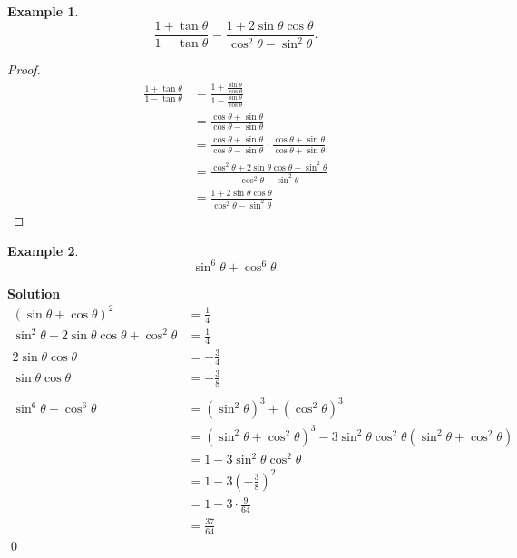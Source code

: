 \documentclass{article}
\newtheorem*{example*}{Example}
\newenvironment{solution}{\begin{trivlist}\item[]{\bf Solution}}{\qed \end{trivlist}}
\begin{document}
\newpage
\begin{example*}
    \[
    \frac{1 + \tan\theta}{1 - \tan\theta} = \frac{1 + 2\sin\theta\cos\theta}{\cos^2\theta - \sin^2\theta}.
    \]
\end{example*}
\begin{proof}
    \begin{align*}
        \frac{1 + \tan\theta}{1 - \tan\theta}
        &= \frac{1 + \frac{\sin\theta}{\cos\theta}}{1 - \frac{\sin\theta}{\cos\theta}} \\
        &= \frac{\cos\theta + \sin\theta}{\cos\theta - \sin\theta} \\
        &= \frac{\cos\theta + \sin\theta}{\cos\theta - \sin\theta} \cdot \frac{\cos\theta + \sin\theta}{\cos\theta + \sin\theta} \\
        &= \frac{\cos^2\theta + 2\sin\theta\cos\theta + \sin^2\theta}{\cos^2\theta - \sin^2\theta} \\
        &= \boxed{\frac{1 + 2\sin\theta\cos\theta}{\cos^2\theta - \sin^2\theta}}
    \end{align*}
\end{proof}

\begin{example*}
    \[
    \sin^6\theta + \cos^6\theta.
    \]
\end{example*}
\begin{solution}
    \begin{align*}
        (\sin\theta + \cos\theta)^2 &= \frac{1}{4} \\
        \sin^2\theta + 2\sin\theta\cos\theta + \cos^2\theta &= \frac{1}{4} \\
        2\sin\theta\cos\theta &= -\frac{3}{4} \\
        \sin\theta\cos\theta &= -\frac{3}{8}
        \\\\
        \sin^6\theta + \cos^6\theta
        &= (\sin^2\theta)^3 + (\cos^2\theta)^3 \\
        &= (\sin^2\theta + \cos^2\theta)^3 - 3\sin^2\theta\cos^2\theta(\sin^2\theta + \cos^2\theta) \\
        &= 1 - 3\sin^2\theta\cos^2\theta \\
        &= 1 - 3\left( -\frac{3}{8} \right)^2 \\
        &= 1 - 3 \cdot \frac{9}{64} \\
        &= \boxed{\frac{37}{64}}
    \end{align*}
\end{solution}
\end{document}
